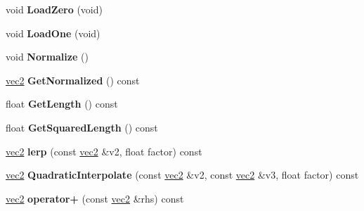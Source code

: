 \begin{DoxyCompactItemize}
\item 
\hypertarget{classmath_1_1vec2_a4beb91a04d26f517f636050b2b83360a}{
void {\bfseries LoadZero} (void)}
\label{classmath_1_1vec2_a4beb91a04d26f517f636050b2b83360a}

\item 
\hypertarget{classmath_1_1vec2_a6d2f854f407658262e0c343b1620cebb}{
void {\bfseries LoadOne} (void)}
\label{classmath_1_1vec2_a6d2f854f407658262e0c343b1620cebb}

\item 
\hypertarget{classmath_1_1vec2_a51c8eb95fe88b45bea7e5af6bfeb5d20}{
void {\bfseries Normalize} ()}
\label{classmath_1_1vec2_a51c8eb95fe88b45bea7e5af6bfeb5d20}

\item 
\hypertarget{classmath_1_1vec2_ac8f352768215389908d40cd41c276274}{
\hyperlink{classmath_1_1vec2}{vec2} {\bfseries GetNormalized} () const }
\label{classmath_1_1vec2_ac8f352768215389908d40cd41c276274}

\item 
\hypertarget{classmath_1_1vec2_a493e2ca35ef3fc3da2130159e7749bed}{
float {\bfseries GetLength} () const }
\label{classmath_1_1vec2_a493e2ca35ef3fc3da2130159e7749bed}

\item 
\hypertarget{classmath_1_1vec2_ad78247f9299b52a39582792f1c349bb2}{
float {\bfseries GetSquaredLength} () const }
\label{classmath_1_1vec2_ad78247f9299b52a39582792f1c349bb2}

\item 
\hypertarget{classmath_1_1vec2_a7d6b8ff5e873fc3edcb87609d050a6fa}{
\hyperlink{classmath_1_1vec2}{vec2} {\bfseries lerp} (const \hyperlink{classmath_1_1vec2}{vec2} \&v2, float factor) const }
\label{classmath_1_1vec2_a7d6b8ff5e873fc3edcb87609d050a6fa}

\item 
\hypertarget{classmath_1_1vec2_aa6a316407f63dd566008c6839839be08}{
\hyperlink{classmath_1_1vec2}{vec2} {\bfseries QuadraticInterpolate} (const \hyperlink{classmath_1_1vec2}{vec2} \&v2, const \hyperlink{classmath_1_1vec2}{vec2} \&v3, float factor) const }
\label{classmath_1_1vec2_aa6a316407f63dd566008c6839839be08}

\item 
\hypertarget{classmath_1_1vec2_aa4e51613daf331e72c57ed00b7511a9e}{
\hyperlink{classmath_1_1vec2}{vec2} {\bfseries operator+} (const \hyperlink{classmath_1_1vec2}{vec2} \&rhs) const }
\label{classmath_1_1vec2_aa4e51613daf331e72c57ed00b7511a9e}


\end{DoxyCompactItemize}
